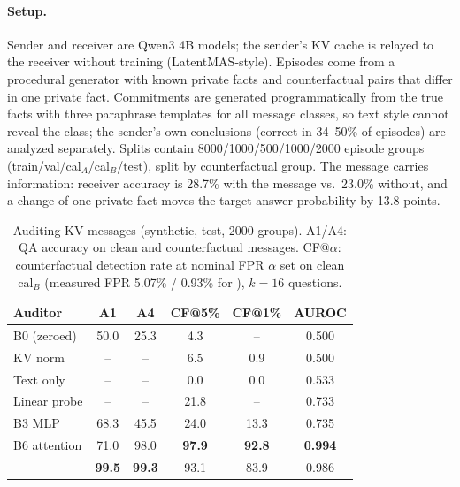 \paragraph{Setup.} Sender and receiver are Qwen3 4B models; the sender's KV cache is relayed to the receiver without training (LatentMAS-style). Episodes come from a procedural generator with known private facts and counterfactual pairs that differ in one private fact. Commitments are generated programmatically from the true facts with three paraphrase templates for all message classes, so text style cannot reveal the class; the sender's own conclusions (correct in 34--50\% of episodes) are analyzed separately. Splits contain 8000/1000/500/1000/2000 episode groups (train/val/cal$_A$/cal$_B$/test), split by counterfactual group. The message carries information: receiver accuracy is 28.7\% with the message vs.\ 23.0\% without, and a change of one private fact moves the target answer probability by 13.8 points.

\begin{table}[t]
\centering
\small
\setlength{\tabcolsep}{3pt}
\begin{tabular}{lccccc}
\toprule
Auditor & A1 & A4 & CF@5\% & CF@1\% & AUROC\\
\midrule
B0 (zeroed) & 50.0 & 25.3 & 4.3 & -- & 0.500\\
KV norm & -- & -- & 6.5 & 0.9 & 0.500\\
Text only & -- & -- & 0.0 & 0.0 & 0.533\\
Linear probe & -- & -- & 21.8 & -- & 0.733\\
B3 MLP & 68.3 & 45.5 & 24.0 & 13.3 & 0.735\\
B6 attention & 71.0 & 98.0 & \textbf{97.9} & \textbf{92.8} & \textbf{0.994}\\
\clr{} & \textbf{99.5} & \textbf{99.3} & 93.1 & 83.9 & 0.986\\
\bottomrule
\end{tabular}
\caption{Auditing KV messages (synthetic, test, 2000 groups). A1/A4: QA accuracy on clean and counterfactual messages. CF@$\alpha$: counterfactual detection rate at nominal FPR $\alpha$ set on clean $\mathrm{cal}_B$ (measured FPR 5.07\% / 0.93\% for \clr{}), $k=16$ questions.}
\label{tab:audit}
\end{table}

